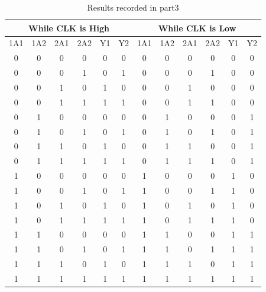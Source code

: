 \documentclass[pdftex,12pt,a4paper]{article}
\begin{document}
\begin{table}[!h]
\centering
\begin{tabular}{|c|c|c|c|c|c|c|c|c|c|c|c|}
\hline
\multicolumn{6}{|c|}{While CLK is High} & \multicolumn{6}{c|}{While CLK is Low} \\ \hline
1A1   & 1A2   & 2A1  & 2A2  & Y1  & Y2  & 1A1  & 1A2  & 2A1  & 2A2  & Y1  & Y2  \\ \hline
0     & 0     & 0    & 0    & 0   & 0   & 0    & 0    & 0    & 0    & 0   & 0   \\ \hline
0     & 0     & 0    & 1    & 0   & 1   & 0    & 0    & 0    & 1    & 0   & 0   \\ \hline
0     & 0     & 1    & 0    & 1   & 0   & 0    & 0    & 1    & 0    & 0   & 0   \\ \hline
0     & 0     & 1    & 1    & 1   & 1   & 0    & 0    & 1    & 1    & 0   & 0   \\ \hline
0     & 1     & 0    & 0    & 0   & 0   & 0    & 1    & 0    & 0    & 0   & 1   \\ \hline
0     & 1     & 0    & 1    & 0   & 1   & 0    & 1    & 0    & 1    & 0   & 1   \\ \hline
0     & 1     & 1    & 0    & 1   & 0   & 0    & 1    & 1    & 0    & 0   & 1   \\ \hline
0     & 1     & 1    & 1    & 1   & 1   & 0    & 1    & 1    & 1    & 0   & 1   \\ \hline
1     & 0     & 0    & 0    & 0   & 0   & 1    & 0    & 0    & 0    & 1   & 0   \\ \hline
1     & 0     & 0    & 1    & 0   & 1   & 1    & 0    & 0    & 1    & 1   & 0   \\ \hline
1     & 0     & 1    & 0    & 1   & 0   & 1    & 0    & 1    & 0    & 1   & 0   \\ \hline
1     & 0     & 1    & 1    & 1   & 1   & 1    & 0    & 1    & 1    & 1   & 0   \\ \hline
1     & 1     & 0    & 0    & 0   & 0   & 1    & 1    & 0    & 0    & 1   & 1   \\ \hline
1     & 1     & 0    & 1    & 0   & 1   & 1    & 1    & 0    & 1    & 1   & 1   \\ \hline
1     & 1     & 1    & 0    & 1   & 0   & 1    & 1    & 1    & 0    & 1   & 1   \\ \hline
1     & 1     & 1    & 1    & 1   & 1   & 1    & 1    & 1    & 1    & 1   & 1   \\ \hline
\end{tabular}
\label{table:part3}
\caption{Results recorded in part3}
\end{table}
\end{document}
